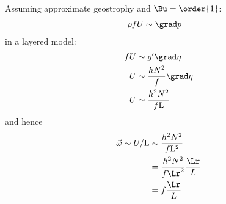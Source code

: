 \begin{derivation}
\label{der:vortscale}
Assuming approximate geostrophy and $\Bu = \order{1}$:
\begin{equation}\begin{split}
\rho fU
&\sim
\grad p
\end{split}\end{equation}
in a layered model:
\begin{equation}\begin{split}
fU
&\sim
g' \grad \eta \\
U
&\sim
\frac{h N^{2}}{f} \grad \eta \\
U
&\sim
\frac{h^{2} N^{2}}{f\mathrm{L}}
\end{split}\end{equation}
and hence
\begin{equation}\begin{split}
\vec{\omega}
\sim
U/\mathrm{L}
&\sim
\frac{h^{2} N^{2}}{f\mathrm{L}^{2}} \\
&=
\frac{h^{2} N^{2}}{f\mathrm{\Lr}^{2}} \frac{\Lr}{L}\\
&=
f\frac{\Lr}{L}
\end{split}\end{equation}
\end{derivation}

